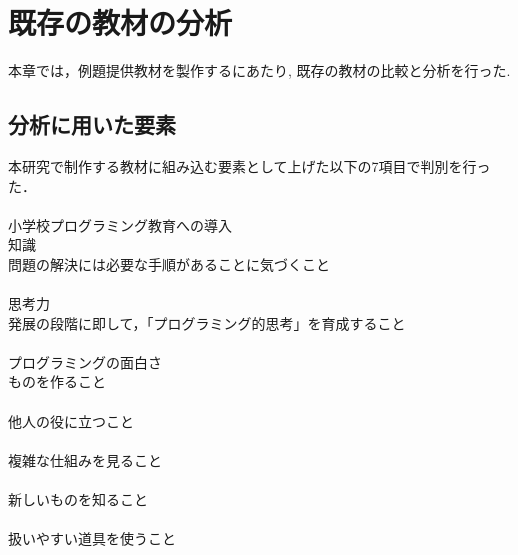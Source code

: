
\newpage

\section{\rm 既存の教材の分析}

本章では，例題提供教材を製作するにあたり, 既存の教材の比較と分析を行った.

\subsection{\rm 分析に用いた要素}
本研究で制作する教材に組み込む要素として上げた以下の7項目で判別を行った．\\\\
小学校プログラミング教育への導入\\
知識\\
問題の解決には必要な手順があることに気づくこと\\\\
思考力\\
発展の段階に即して，「プログラミング的思考」を育成すること\\\\
プログラミングの面白さ\\
ものを作ること\\\\
他人の役に立つこと\\\\
複雑な仕組みを見ること\\\\
新しいものを知ること\\\\
扱いやすい道具を使うこと\\


